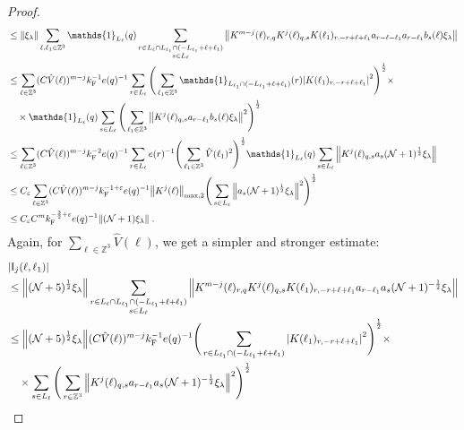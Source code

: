 \documentclass[12pt,a4paper]{article}
\numberwithin{equation}{section}
\newcommand{\1}{\mathbb{I}}
\newcommand{\F}{\mathrm{F}}
\newcommand{\I}{\mathrm{I}}
\newcommand{\kF}{k_\F}
\newcommand{\Zstar}{\mathbb{Z}^3} %
\newcommand{\Z}{\mathbb{Z}}
\newcommand{\NN}{\mathcal{N}}
\newcommand{\half}{\frac{1}{2}}
\theoremstyle{plain}
\theoremstyle{definition}
\theoremstyle{remark}
\theoremstyle{plain}
\theoremstyle{definition}
\theoremstyle{remark}
\begin{document}
\begin{proof}
\begin{align}
	&\leq \norm{ \xi_\lambda} \sum_{\ell,\ell_1 \in \Zstar} \mathds{1}_{L_\ell}(q)
		\sum\limits_{\substack{r\in L_{\ell} \cap L_{\ell_1}  \cap (-L_{\ell_1} + \ell + \ell_1)\\s\in L_{\ell}}}
		\norm{K^{m-j}(\ell)_{r,q} K^j(\ell)_{q,s} K(\ell_1)_{r,-r+\ell+\ell_1} a_{r-\ell-\ell_1} a_{r-\ell_1} b_{s}(\ell) \xi_\lambda }\nonumber\\
	&\leq \sum_{\ell \in \Zstar}
		(C \hat{V}(\ell))^{m-j} \kF^{-1} e(q)^{-1}
		\sum\limits_{r \in L_\ell} \Bigg(\sum_{\ell_1 \in \Zstar} \mathds{1}_{L_{\ell_1} \cap (-L_{\ell_1}+\ell+\ell_1)}(r) \abs{ K(\ell_1)_{r,-r+\ell+\ell_1} }^2\Bigg)^\half \times\nonumber\\ 
	&\quad \times \mathds{1}_{L_\ell}(q) \sum\limits_{s\in L_{\ell}} \Bigg( \sum_{\ell_1 \in \Z^3} \norm{K^{j}(\ell)_{q,s} a_{r-\ell_1} b_{s}(\ell) \xi_\lambda }^2 \Bigg)^\half \nonumber\\
	&\leq \sum_{\ell \in \Zstar}
		(C \hat{V}(\ell))^{m-j} \kF^{-2} e(q)^{-1}
		\sum\limits_{r \in L_\ell} e(r)^{-1} \Bigg(\sum_{\ell_1 \in \Zstar} \hat{V}(\ell_1)^2 \Bigg)^\half
		\mathds{1}_{L_\ell}(q) \sum\limits_{s\in L_{\ell}} \norm{K^{j}(\ell)_{q,s} a_s (\NN+1)^{\half} \xi_\lambda } \nonumber\\
	&\leq C_\varepsilon \sum_{\ell \in \Zstar}
		(C \hat{V}(\ell))^{m-j} \kF^{-1+\varepsilon} e(q)^{-1}
		\norm{K^j(\ell)}_{\max,2}
		\Bigg( \sum\limits_{s\in L_{\ell}} \norm{a_s (\NN+1)^{\half} \xi_\lambda }^2 \Bigg)^{\half} \nonumber\\
	&\leq C_\varepsilon C^m \kF^{-\frac 32 + \varepsilon} e(q)^{-1} \norm{(\NN+1) \xi_\lambda } \;. \label{eq:estEQ1122_Coulomb}
\end{align}
Again, for $ \sum_{\ell \in \Zstar} \hat{V}(\ell) $, we get a simpler and stronger estimate:
\begin{align}
	&|\I_j(\ell, \ell_1)| \nonumber\\
	&\leq \norm{ (\NN+5)^{\half} \xi_\lambda}
		\sum_{\substack{r\in L_{\ell} \cap L_{\ell_1} \cap (-L_{\ell_1} + \ell + \ell_1)\\s\in L_{\ell}}}
		\norm{K^{m-j}(\ell)_{r,q} K^j(\ell)_{q,s} K(\ell_1)_{r,-r+\ell+\ell_1} a_{r-\ell_1} a_s (\NN+1)^{-\half} \xi_\lambda }\nonumber\\
	&\leq \norm{ (\NN+5)^{\half} \xi_\lambda} 
		(C \hat{V}(\ell))^{m-j} \kF^{-1} e(q)^{-1}
		\Bigg(\sum_{r\in L_{\ell_1} \cap (-L_{\ell_1} + \ell + \ell_1)}\abs{ K(\ell_1)_{r,-r+\ell+\ell_1} }^2\Bigg)^\half \times \nonumber\\
	&\quad \times \sum_{s\in L_{\ell}} \Bigg( \sum_{r \in \Z^3}\norm{K^{j}(\ell)_{q,s} a_{r-\ell_1} a_s (\NN+1)^{-\half} \xi_\lambda }^2 \Bigg)^\half \nonumber\\

\end{align}
\end{proof}
\end{document}
